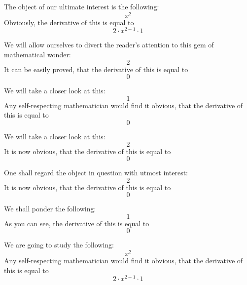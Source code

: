 \documentclass{article}
\begin{document}
The object of our ultimate interest is the following:
\begin{equation}
x ^{2 } 
\end{equation}
Obviously, the derivative of this is equal to
\begin{equation}
2 \cdot x ^{2 - 1 } \cdot 1 
\end{equation}

We will allow ourselves to divert the reader's attention to this gem of mathematical wonder:
\begin{equation}
2 
\end{equation}
It can be easily proved, that the derivative of this is equal to
\begin{equation}
0 
\end{equation}

We will take a closer look at this:
\begin{equation}
1 
\end{equation}
Any self-respecting mathematician would find it obvious, that the derivative of this is equal to
\begin{equation}
0 
\end{equation}

We will take a closer look at this:
\begin{equation}
2 
\end{equation}
It is now obvious, that the derivative of this is equal to
\begin{equation}
0 
\end{equation}

One shall regard the object in question with utmost interest:
\begin{equation}
2 
\end{equation}
It is now obvious, that the derivative of this is equal to
\begin{equation}
0 
\end{equation}

We shall ponder the following:
\begin{equation}
1 
\end{equation}
As you can see, the derivative of this is equal to
\begin{equation}
0 
\end{equation}

We are going to study the following:
\begin{equation}
x ^{2 } 
\end{equation}
Any self-respecting mathematician would find it obvious, that the derivative of this is equal to
\begin{equation}
2 \cdot x ^{2 - 1 } \cdot 1 
\end{equation}
\end{document}
